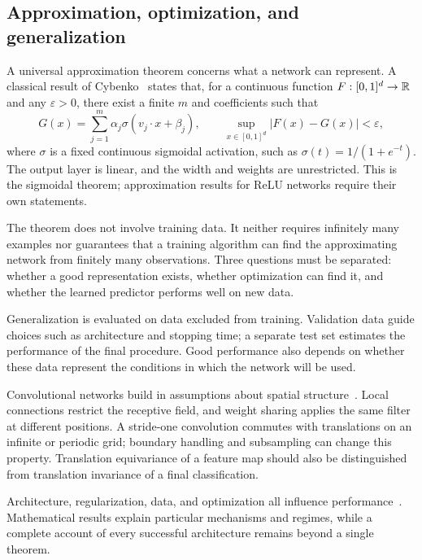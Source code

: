 \subsection{Approximation, optimization, and generalization}
A universal approximation theorem concerns what a network can represent. A classical result of Cybenko~\cite{cybenko1989approximation} states that, for a continuous function $F:[0,1]^d\to\mathbb{R}$ and any $\varepsilon>0$, there exist a finite $m$ and coefficients such that
\[
 G(x)=\sum_{j=1}^m\alpha_j\sigma(v_j\cdot x+\beta_j),
 \qquad \sup_{x\in[0,1]^d}|F(x)-G(x)|<\varepsilon,
\]
where $\sigma$ is a fixed continuous sigmoidal activation, such as $\sigma(t)=1/(1+e^{-t})$. The output layer is linear, and the width and weights are unrestricted. This is the sigmoidal theorem; approximation results for ReLU networks require their own statements.

The theorem does not involve training data. It neither requires infinitely many examples nor guarantees that a training algorithm can find the approximating network from finitely many observations. Three questions must be separated: whether a good representation exists, whether optimization can find it, and whether the learned predictor performs well on new data.

Generalization is evaluated on data excluded from training. Validation data guide choices such as architecture and stopping time; a separate test set estimates the performance of the final procedure. Good performance also depends on whether these data represent the conditions in which the network will be used.

Convolutional networks build in assumptions about spatial structure~\cite{lecun1998gradient}. Local connections restrict the receptive field, and weight sharing applies the same filter at different positions. A stride-one convolution commutes with translations on an infinite or periodic grid; boundary handling and subsampling can change this property. Translation equivariance of a feature map should also be distinguished from translation invariance of a final classification.

Architecture, regularization, data, and optimization all influence performance~\cite{lecun2015deep}. Mathematical results explain particular mechanisms and regimes, while a complete account of every successful architecture remains beyond a single theorem.
